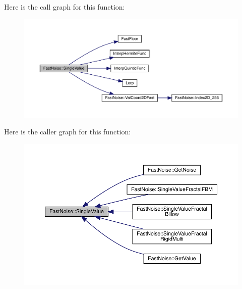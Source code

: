 Here is the call graph for this function\+:
\nopagebreak
\begin{figure}[H]
\begin{center}
\leavevmode
\includegraphics[width=350pt]{class_fast_noise_a9704c1a9f62ad5fcf8e42b15ad8df389_cgraph}
\end{center}
\end{figure}
Here is the caller graph for this function\+:
\nopagebreak
\begin{figure}[H]
\begin{center}
\leavevmode
\includegraphics[width=350pt]{class_fast_noise_a9704c1a9f62ad5fcf8e42b15ad8df389_icgraph}
\end{center}
\end{figure}
\mbox{\label{class_fast_noise_a982fae6250ecadc33331384167fcbc2d}} 
